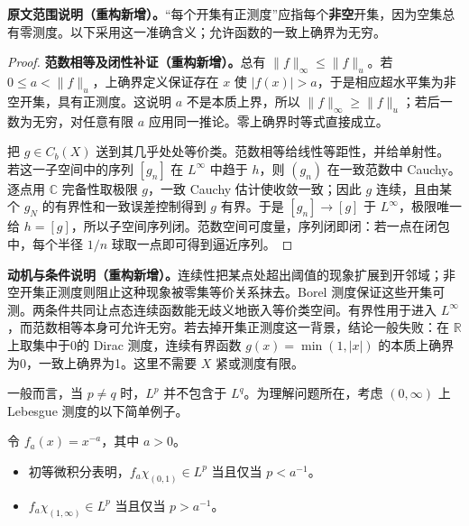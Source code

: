 \documentclass[../../main.tex]{subfiles}
\begin{document}
\begin{remark}
\textbf{原文范围说明（重构新增）。}“每个开集有正测度”应指每个\textbf{非空}开集，因为空集总有零测度。以下采用这一准确含义；允许函数的一致上确界为无穷。
\end{remark}
\begin{proof}
\textbf{范数相等及闭性补证（重构新增）。}总有 $\|f\|_\infty\leqslant\|f\|_u$。若 $0\leqslant a<\|f\|_u$，上确界定义保证存在 $x$ 使 $|f(x)|>a$，于是相应超水平集为非空开集，具有正测度。这说明 $a$ 不是本质上界，所以 $\|f\|_\infty\geqslant\|f\|_u$；若后一数为无穷，对任意有限 $a$ 应用同一推论。零上确界时等式直接成立。

把 $g\in C_b(X)$ 送到其几乎处处等价类。范数相等给线性等距性，并给单射性。若这一子空间中的序列 $[g_n]$ 在 $L^\infty$ 中趋于 $h$，则 $(g_n)$ 在一致范数中 Cauchy。逐点用 $\mathbb C$ 完备性取极限 $g$，一致 Cauchy 估计使收敛一致；因此 $g$ 连续，且由某个 $g_N$ 的有界性和一致误差控制得到 $g$ 有界。于是 $[g_n]\to[g]$ 于 $L^\infty$，极限唯一给 $h=[g]$，所以子空间序列闭。范数空间可度量，序列闭即闭：若一点在闭包中，每个半径 $1/n$ 球取一点即可得到逼近序列。
\end{proof}
\begin{remark}
\textbf{动机与条件说明（重构新增）。}连续性把某点处超出阈值的现象扩展到开邻域；非空开集正测度则阻止这种现象被零集等价关系抹去。Borel 测度保证这些开集可测。两条件共同让点态连续函数能无歧义地嵌入等价类空间。有界性用于进入 $L^\infty$，而范数相等本身可允许无穷。若去掉开集正测度这一背景，结论一般失败：在 $\mathbb R$ 上取集中于0的 Dirac 测度，连续有界函数 $g(x)=\min(1,|x|)$ 的本质上确界为0，一致上确界为1。这里不需要 $X$ 紧或测度有限。
\end{remark}
一般而言，当 $p\ne q$ 时，$L^p$ 并不包含于 $L^q$。为理解问题所在，考虑 $(0,\infty)$ 上 Lebesgue 测度的以下简单例子。
\begin{examples}\label{examples:ch06-power-integrability}
令 $f_a(x)=x^{-a}$，其中 $a>0$。
\begin{itemize}
\item 初等微积分表明，$f_a\chi_{(0,1)}\in L^p$ 当且仅当 $p<a^{-1}$。
\item $f_a\chi_{(1,\infty)}\in L^p$ 当且仅当 $p>a^{-1}$。
\end{itemize}
\end{examples}
\end{document}
